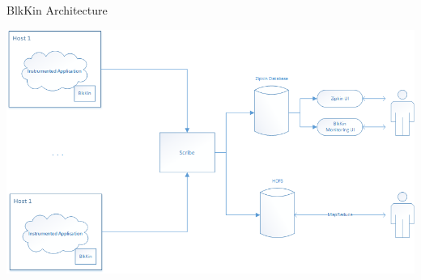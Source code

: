 \begin{frame}{BlkKin Architecture}
\begin{center}
\includegraphics[scale=0.5]{images/blkin-deploy.png}
\end{center}
\end{frame}

